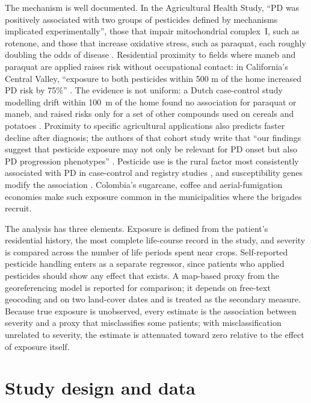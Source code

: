 \documentclass[11pt,a4paper]{article}
\begin{document}
The mechanism is well documented. In the Agricultural Health Study, ``PD was positively associated with two groups of pesticides defined by mechanisms implicated experimentally'', those that impair mitochondrial complex~I, such as rotenone, and those that increase oxidative stress, such as paraquat, each roughly doubling the odds of disease \citep{tanner_rotenone_2011}. Residential proximity to fields where maneb and paraquat are applied raises risk without occupational contact: in California's Central Valley, ``exposure to both pesticides within 500 m of the home increased PD risk by 75\%'' \citep{costello_parkinson_2009}. The evidence is not uniform: a Dutch case-control study modelling drift within 100~m of the home found no association for paraquat or maneb, and raised risks only for a set of other compounds used on cereals and potatoes \citep{brouwer_environmental_2017}. Proximity to specific agricultural applications also predicts faster decline after diagnosis; the authors of that cohort study write that ``our findings suggest that pesticide exposure may not only be relevant for PD onset but also PD progression phenotypes'' \citep{li_proximity_2023}. Pesticide use is the rural factor most consistently associated with PD in case-control and registry studies \citep{seidler_possible_1996,wan_parkinson_2016}, and susceptibility genes modify the association \citep{ritz_pesticides_2016}. Colombia's sugarcane, coffee and aerial-fumigation economies make such exposure common in the municipalities where the brigades recruit.

The analysis has three elements. Exposure is defined from the patient's residential history, the most complete life-course record in the study, and severity is compared across the number of life periods spent near crops. Self-reported pesticide handling enters as a separate regressor, since patients who applied pesticides should show any effect that exists. A map-based proxy from the georeferencing model is reported for comparison; it depends on free-text geocoding and on two land-cover dates and is treated as the secondary measure. Because true exposure is unobserved, every estimate is the association between severity and a proxy that misclassifies some patients; with misclassification unrelated to severity, the estimate is attenuated toward zero relative to the effect of exposure itself.

\section{Study design and data}
\end{document}
